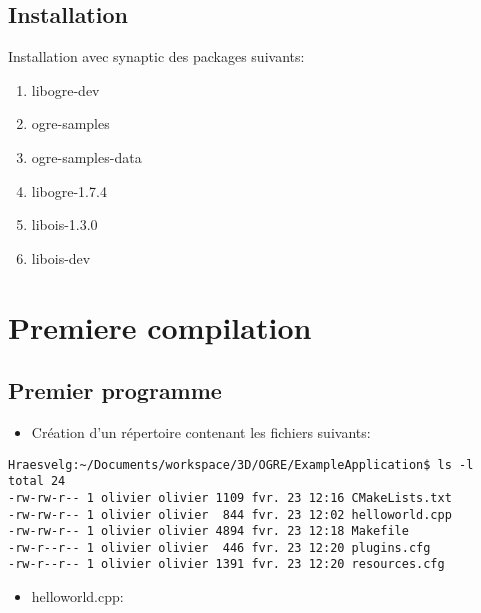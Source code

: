 \documentclass[10pt,a4paper]{report}
\begin{document}
\section{Installation}
Installation avec synaptic des packages suivants:
\begin{enumerate}
\item libogre-dev
\item ogre-samples
\item ogre-samples-data
\item libogre-1.7.4
\item libois-1.3.0
\item libois-dev 
\end{enumerate}






\chapter{Premiere compilation}

\section{Premier programme}

\begin{itemize}
\item Cr\'eation d'un r\'epertoire contenant les fichiers suivants:
\end{itemize}

\begin{lstlisting}
Hraesvelg:~/Documents/workspace/3D/OGRE/ExampleApplication$ ls -l
total 24
-rw-rw-r-- 1 olivier olivier 1109 fvr. 23 12:16 CMakeLists.txt
-rw-rw-r-- 1 olivier olivier  844 fvr. 23 12:02 helloworld.cpp
-rw-rw-r-- 1 olivier olivier 4894 fvr. 23 12:18 Makefile
-rw-r--r-- 1 olivier olivier  446 fvr. 23 12:20 plugins.cfg
-rw-r--r-- 1 olivier olivier 1391 fvr. 23 12:20 resources.cfg
\end{lstlisting}


\begin{itemize}
\item helloworld.cpp:
\end{itemize}
\end{document}
